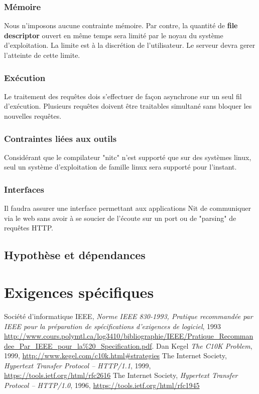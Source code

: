 \documentclass{scrreprt}
\begin{document}
\subsection{Mémoire}
Nous n'imposons aucune contrainte mémoire. Par contre, la quantité de
\textbf{file descriptor} ouvert en même temps sera limité par le noyau du
système d'exploitation. La limite est à la discrétion de l'utilisateur. Le
serveur devra gerer l'atteinte de cette limite.
\subsection{Exécution}
Le traitement des requêtes dois s'effectuer de façon asynchrone sur un seul fil
d'exécution. Plusieurs requêtes doivent être traitables simultané sans bloquer
les nouvelles requêtes.
\subsection{Contraintes liées aux outils}
Considérant que le compilateur "nitc" n'est supporté que sur des systèmes
linux, seul un système d'exploitation de famille linux sera supporté pour
l'instant.
\subsection{Interfaces}
Il faudra assurer une interface permettant aux applications Nit de communiquer
via le web sans avoir à se soucier de l'écoute sur un port ou de "parsing" de
requêtes HTTP.
\section{Hypothèse et dépendances}
\chapter{Exigences spécifiques}

\begin{thebibliography}{9}
  Société d'informatique IEEE,
\emph{Norme IEEE 830-1993, Pratique recommandée par IEEE pour la préparation de
spécifications d’exigences de logiciel}, 1993
\url{http://www.cours.polymtl.ca/log3410/bibliographie/IEEE/Pratique_Recommandee_Par_IEEE_pour_la%20_Specification.pdf}.
  Dan Kegel
\emph{The C10K Problem}, 1999, \url{http://www.kegel.com/c10k.html#strategies}
    The Internet Society,
\emph{Hypertext Transfer Protocol -- HTTP/1.1}, 1999,
\url{https://tools.ietf.org/html/rfc2616}
    The Internet Society,
\emph{Hypertext Transfer Protocol -- HTTP/1.0}, 1996,
\url{https://tools.ietf.org/html/rfc1945}
\end{thebibliography}

\end{document}
